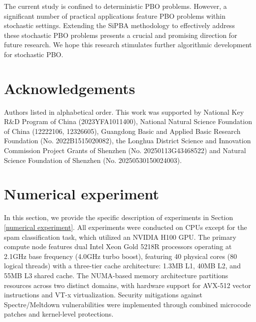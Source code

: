 \documentclass{article}
\begin{document}
The current study is confined to deterministic PBO problems. However, a significant number of practical applications feature PBO problems within stochastic settings. Extending the SiPBA methodology to effectively address these stochastic PBO problems presents a crucial and promising direction for future research. We hope this research stimulates further algorithmic development for stochastic PBO.


\clearpage
\section*{Acknowledgements}
Authors listed in alphabetical order. This work was supported by National Key R\&D Program of China (2023YFA1011400), National Natural Science Foundation of China (12222106, 12326605), Guangdong Basic and Applied Basic Research Foundation (No. 2022B1515020082), the Longhua District Science and Innovation Commission Project Grants of Shenzhen (No. 20250113G43468522) and Natural Science Foundation of Shenzhen (No. 20250530150024003).














\clearpage
\appendix



\section{Numerical experiment}\label{experiment}
    In this section, we provide the specific description of experiments in Section \ref{numerical experiment}. All experiments were conducted on CPUs except for the spam classification task, which utilized an NVIDIA H100 GPU. The primary compute node features dual Intel Xeon Gold 5218R processors operating at 2.1GHz base frequency (4.0GHz turbo boost), featuring 40 physical cores (80 logical threads) with a three-tier cache architecture: 1.3MB L1, 40MB L2, and 55MB L3 shared cache. The NUMA-based memory architecture partitions resources across two distinct domains, with hardware support for AVX-512 vector instructions and VT-x virtualization. Security mitigations against Spectre/Meltdown vulnerabilities were implemented through combined microcode patches and kernel-level protections.
\end{document}
